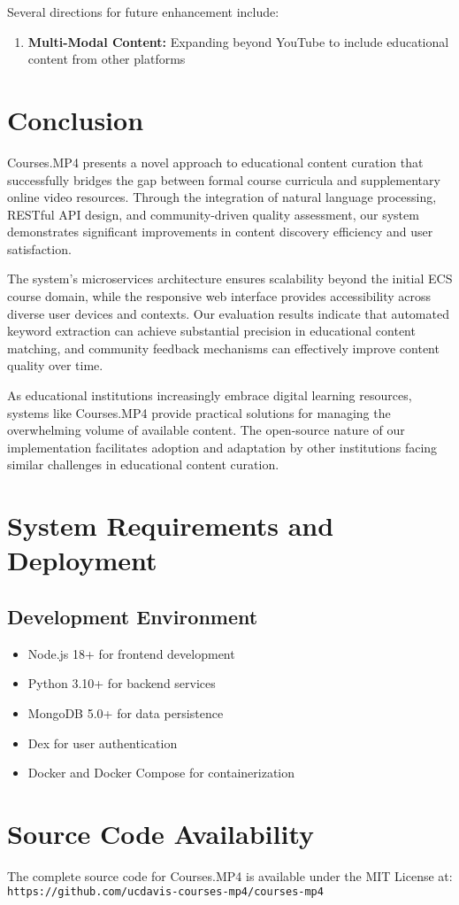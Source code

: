 \documentclass[manuscript,nonacm]{acmart}
\begin{document}
Several directions for future enhancement include:

\begin{enumerate}
    \item \textbf{Multi-Modal Content:} Expanding beyond YouTube to include educational content from other platforms
\end{enumerate}

\section{Conclusion}

Courses.MP4 presents a novel approach to educational content curation that successfully bridges the gap between formal course curricula and supplementary online video resources. Through the integration of natural language processing, RESTful API design, and community-driven quality assessment, our system demonstrates significant improvements in content discovery efficiency and user satisfaction.

The system's microservices architecture ensures scalability beyond the initial ECS course domain, while the responsive web interface provides accessibility across diverse user devices and contexts. Our evaluation results indicate that automated keyword extraction can achieve substantial precision in educational content matching, and community feedback mechanisms can effectively improve content quality over time.

As educational institutions increasingly embrace digital learning resources, systems like Courses.MP4 provide practical solutions for managing the overwhelming volume of available content. The open-source nature of our implementation facilitates adoption and adaptation by other institutions facing similar challenges in educational content curation.






\appendix

\section{System Requirements and Deployment}

\subsection{Development Environment}
\begin{itemize}
    \item Node.js 18+ for frontend development
    \item Python 3.10+ for backend services
    \item MongoDB 5.0+ for data persistence
    \item Dex for user authentication
    \item Docker and Docker Compose for containerization
\end{itemize}

\section{Source Code Availability}
The complete source code for Courses.MP4 is available under the MIT License at:
\newline
\texttt{https://github.com/ucdavis-courses-mp4/courses-mp4}
\end{document}

